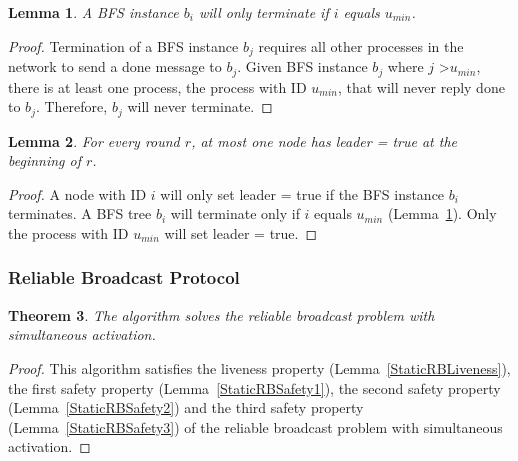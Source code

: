 \documentclass[english]{article}
\newtheorem{theorem}{Theorem}[section]
\newtheorem{lemma}[theorem]{Lemma}
\begin{document}
\begin{lemma}
\label{BFSTermination}
  A BFS instance $b_i$ will only terminate if $i$ equals $u_{min}$.
\end{lemma}
\begin{proof}
Termination of a BFS instance $b_j$ requires all other processes in the network to send a done message to $b_j$.
Given BFS instance $b_j$ where $j$ \textgreater $u_{min}$, there is at least one process, the process with ID $u_{min}$, that will never reply done to $b_j$.
Therefore, $b_j$ will never terminate.
\end{proof}


\begin{lemma}
\label{LESafetyStatic}
For every round $r$, at most one node has leader = true at the beginning of $r$.
\end{lemma}
\begin{proof}
A node with ID $i$ will only set leader = true if the BFS instance $b_i$ terminates.
A BFS tree $b_i$ will terminate only if $i$ equals $u_{min}$ (Lemma~\ref{BFSTermination}).
Only the process with ID $u_{min}$ will set leader = true. 
\end{proof}

\subsubsection {Reliable Broadcast Protocol}

\begin{theorem}
\label{StaticReliableBroadcast}
The algorithm solves the reliable broadcast problem with simultaneous activation.
\end{theorem}
\begin{proof}
This algorithm satisfies the liveness property (Lemma~\ref{StaticRBLiveness}), 
the first safety property (Lemma~\ref{StaticRBSafety1}),
the second safety property (Lemma~\ref{StaticRBSafety2}) and 
the third safety property (Lemma~\ref{StaticRBSafety3}) of the reliable broadcast problem with simultaneous activation.
\end{proof}
\end{document}
